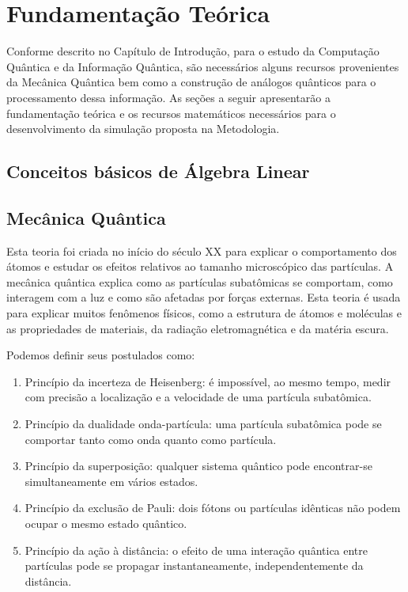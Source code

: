 
\chapter{Fundamentação Teórica}

Conforme descrito no Capítulo de Introdução, para o estudo da Computação Quântica e da Informação Quântica, são necessários alguns recursos provenientes da Mecânica Quântica bem como a construção de análogos quânticos para o processamento dessa informação. As seções a seguir apresentarão a fundamentação teórica e os recursos matemáticos necessários para o desenvolvimento da simulação proposta na Metodologia.

\section{Conceitos básicos de Álgebra Linear}


\section{Mecânica Quântica}\label{Mecanicaquantica}

Esta teoria foi criada no início do século XX para explicar o comportamento dos átomos e estudar os efeitos relativos ao tamanho microscópico das partículas. A mecânica quântica explica como as partículas subatômicas se comportam, como interagem com a luz e como são afetadas por forças externas. Esta teoria é usada para explicar muitos fenômenos físicos, como a estrutura de átomos e moléculas e as propriedades de materiais, da radiação eletromagnética e da matéria escura.

Podemos definir seus postulados como:
\begin{enumerate}
\item Princípio da incerteza de Heisenberg: é impossível, ao mesmo tempo, medir com precisão a localização e a velocidade de uma partícula subatômica.

\item Princípio da dualidade onda-partícula: uma partícula subatômica pode se comportar tanto como onda quanto como partícula.

\item Princípio da superposição: qualquer sistema quântico pode encontrar-se simultaneamente em vários estados.

\item Princípio da exclusão de Pauli: dois fótons ou partículas idênticas não podem ocupar o mesmo estado quântico.

\item Princípio da ação à distância: o efeito de uma interação quântica entre partículas pode se propagar instantaneamente, independentemente da distância.
\end{enumerate}

